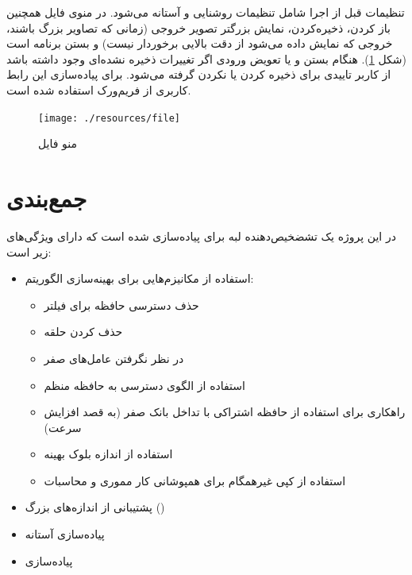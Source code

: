 \documentclass{article}
\begin{document}
تنظیمات قبل از اجرا شامل تنظیمات روشنایی و آستانه می‌شود.
در منوی فایل همچنین باز کردن، ذخیره‌کردن،‌ نمایش بزرگتر تصویر خروجی (زمانی که تصاویر بزرگ باشند، خروجی که نمایش داده می‌شود از دقت بالایی برخوردار نیست) و بستن برنامه است (شکل \ref{fig:file}). هنگام بستن و یا تعویض ورودی اگر تغییرات ذخیره نشد‌ه‌ای وجود داشته باشد از کاربر تاییدی برای ذخیره کردن یا نکردن گرفته می‌شود. برای پیاده‌سازی این رابط کاربری از فریم‌ورک 
استفاده شده است.

\begin{figure}
	\centering
	\texttt{[image: ./resources/file]}
	\caption{منو فایل}
	\label{fig:file}
\end{figure}

\section{جمع‌بندی}
در این پروژه یک تشضخیص‌دهنده لبه برای  پیاده‌سازی شده است که دارای ویژگی‌های زیر است:
\begin{itemize}
	\item استفاده از مکانیز‌م‌هایی برای بهینه‌سازی الگوریتم:
	\begin{itemize}
		\item حذف دسترسی حافظه برای فیلتر
		\item حذف کردن حلقه 
		\item در نظر نگرفتن عامل‌های صفر
		\item استفاده از الگوی دسترسی به حافظه منظم
		\item راهکاری برای استفاده از حافظه اشتراکی با تداخل بانک صفر (به قصد افزایش سرعت)
		\item استفاده از اندازه بلوک بهینه
		\item استفاده از کپی غیرهمگام برای همپوشانی کار مموری و محاسبات
	\end{itemize}
	\item پشتیبانی از اندازه‌های بزرگ ()
	\item پیاده‌سازی آستانه
	\item پیاده‌سازی 
\end{itemize}
\end{document}
